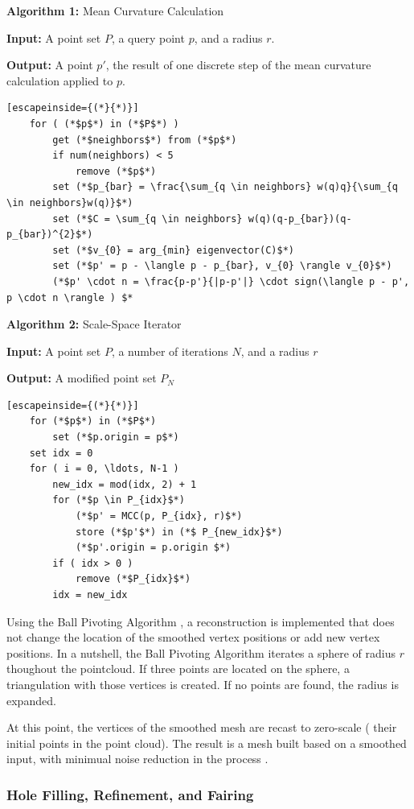 \documentclass[12pt]{drexelthesis}
\let\Oldsubsubsection\subsubsection
\renewcommand{\subsubsection}{\FloatBarrier\Oldsubsubsection}
\begin{document}
\textbf{Algorithm 1:} Mean Curvature Calculation

  \textbf{Input:} A point set $P$, a query point $p$, and a radius $r$.
	
  \textbf{Output:} A point $p'$, the result of one discrete step of the mean curvature calculation applied to $p$.
\begin{lstlisting}[escapeinside={(*}{*)}]
	for ( (*$p$*) in (*$P$*) )
		get (*$neighbors$*) from (*$p$*)
		if num(neighbors) < 5
			remove (*$p$*)
		set (*$p_{bar} = \frac{\sum_{q \in neighbors} w(q)q}{\sum_{q \in neighbors}w(q)}$*)
		set (*$C = \sum_{q \in neighbors} w(q)(q-p_{bar})(q-p_{bar})^{2}$*)
		set (*$v_{0} = arg_{min} eigenvector(C)$*)
		set (*$p' = p - \langle p - p_{bar}, v_{0} \rangle v_{0}$*)
		(*$p' \cdot n = \frac{p-p'}{|p-p'|} \cdot sign(\langle p - p', p \cdot n \rangle ) $*	
\end{lstlisting}

\textbf{Algorithm 2:} Scale-Space Iterator

  \textbf{Input:} A point set $P$, a number of iterations $N$, and a radius $r$
	
  \textbf{Output:} A modified point set $P_{N}$


\begin{lstlisting}[escapeinside={(*}{*)}]
	for (*$p$*) in (*$P$*)
		set (*$p.origin = p$*)
	set idx = 0
	for ( i = 0, \ldots, N-1 )
		new_idx = mod(idx, 2) + 1
		for (*$p \in P_{idx}$*)
			(*$p' = MCC(p, P_{idx}, r)$*)
			store (*$p'$*) in (*$ P_{new_idx}$*)
			(*$p'.origin = p.origin $*)
		if ( idx > 0 )
			remove (*$P_{idx}$*)
		idx = new_idx
\end{lstlisting}

Using the Ball Pivoting Algorithm \cite{ballpivot}, a reconstruction is implemented that does not change the location of the smoothed vertex positions or add new vertex positions. In a nutshell, the Ball Pivoting Algorithm iterates a sphere of radius $r$ thoughout the pointcloud. If three points are located on the sphere, a triangulation with those vertices is created. If no points are found, the radius is expanded.

At this point, the vertices of the smoothed mesh are recast to zero-scale ( their initial points in the point cloud). The result is a mesh built based on a smoothed input, with minimual noise reduction in the process \cite{RN67}.

\subsubsection{Hole Filling, Refinement, and Fairing}
\end{document}
